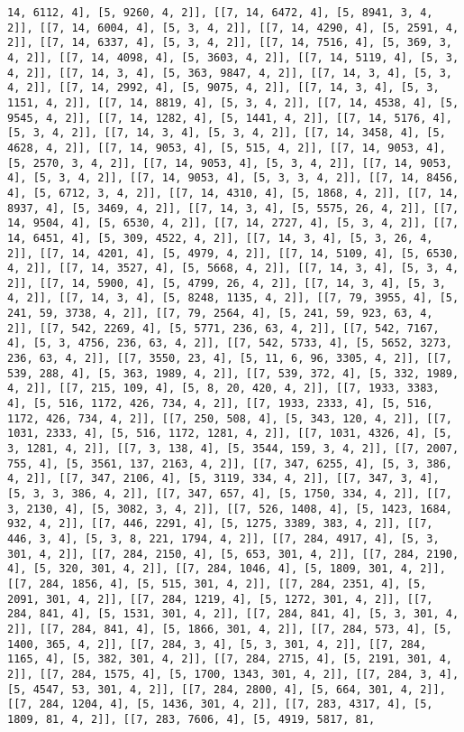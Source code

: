 \documentclass[12pt,fleqn]{article}\usepackage{../../common}
\begin{document}
\begin{verbatim}
14, 6112, 4], [5, 9260, 4, 2]], [[7, 14, 6472, 4], [5, 8941, 3, 4, 2]], [[7, 14, 6004, 4], [5, 3, 4, 2]], [[7, 14, 4290, 4], [5, 2591, 4, 2]], [[7, 14, 6337, 4], [5, 3, 4, 2]], [[7, 14, 7516, 4], [5, 369, 3, 4, 2]], [[7, 14, 4098, 4], [5, 3603, 4, 2]], [[7, 14, 5119, 4], [5, 3, 4, 2]], [[7, 14, 3, 4], [5, 363, 9847, 4, 2]], [[7, 14, 3, 4], [5, 3, 4, 2]], [[7, 14, 2992, 4], [5, 9075, 4, 2]], [[7, 14, 3, 4], [5, 3, 1151, 4, 2]], [[7, 14, 8819, 4], [5, 3, 4, 2]], [[7, 14, 4538, 4], [5, 9545, 4, 2]], [[7, 14, 1282, 4], [5, 1441, 4, 2]], [[7, 14, 5176, 4], [5, 3, 4, 2]], [[7, 14, 3, 4], [5, 3, 4, 2]], [[7, 14, 3458, 4], [5, 4628, 4, 2]], [[7, 14, 9053, 4], [5, 515, 4, 2]], [[7, 14, 9053, 4], [5, 2570, 3, 4, 2]], [[7, 14, 9053, 4], [5, 3, 4, 2]], [[7, 14, 9053, 4], [5, 3, 4, 2]], [[7, 14, 9053, 4], [5, 3, 3, 4, 2]], [[7, 14, 8456, 4], [5, 6712, 3, 4, 2]], [[7, 14, 4310, 4], [5, 1868, 4, 2]], [[7, 14, 8937, 4], [5, 3469, 4, 2]], [[7, 14, 3, 4], [5, 5575, 26, 4, 2]], [[7, 14, 9504, 4], [5, 6530, 4, 2]], [[7, 14, 2727, 4], [5, 3, 4, 2]], [[7, 14, 6451, 4], [5, 309, 4522, 4, 2]], [[7, 14, 3, 4], [5, 3, 26, 4, 2]], [[7, 14, 4201, 4], [5, 4979, 4, 2]], [[7, 14, 5109, 4], [5, 6530, 4, 2]], [[7, 14, 3527, 4], [5, 5668, 4, 2]], [[7, 14, 3, 4], [5, 3, 4, 2]], [[7, 14, 5900, 4], [5, 4799, 26, 4, 2]], [[7, 14, 3, 4], [5, 3, 4, 2]], [[7, 14, 3, 4], [5, 8248, 1135, 4, 2]], [[7, 79, 3955, 4], [5, 241, 59, 3738, 4, 2]], [[7, 79, 2564, 4], [5, 241, 59, 923, 63, 4, 2]], [[7, 542, 2269, 4], [5, 5771, 236, 63, 4, 2]], [[7, 542, 7167, 4], [5, 3, 4756, 236, 63, 4, 2]], [[7, 542, 5733, 4], [5, 5652, 3273, 236, 63, 4, 2]], [[7, 3550, 23, 4], [5, 11, 6, 96, 3305, 4, 2]], [[7, 539, 288, 4], [5, 363, 1989, 4, 2]], [[7, 539, 372, 4], [5, 332, 1989, 4, 2]], [[7, 215, 109, 4], [5, 8, 20, 420, 4, 2]], [[7, 1933, 3383, 4], [5, 516, 1172, 426, 734, 4, 2]], [[7, 1933, 2333, 4], [5, 516, 1172, 426, 734, 4, 2]], [[7, 250, 508, 4], [5, 343, 120, 4, 2]], [[7, 1031, 2333, 4], [5, 516, 1172, 1281, 4, 2]], [[7, 1031, 4326, 4], [5, 3, 1281, 4, 2]], [[7, 3, 138, 4], [5, 3544, 159, 3, 4, 2]], [[7, 2007, 755, 4], [5, 3561, 137, 2163, 4, 2]], [[7, 347, 6255, 4], [5, 3, 386, 4, 2]], [[7, 347, 2106, 4], [5, 3119, 334, 4, 2]], [[7, 347, 3, 4], [5, 3, 3, 386, 4, 2]], [[7, 347, 657, 4], [5, 1750, 334, 4, 2]], [[7, 3, 2130, 4], [5, 3082, 3, 4, 2]], [[7, 526, 1408, 4], [5, 1423, 1684, 932, 4, 2]], [[7, 446, 2291, 4], [5, 1275, 3389, 383, 4, 2]], [[7, 446, 3, 4], [5, 3, 8, 221, 1794, 4, 2]], [[7, 284, 4917, 4], [5, 3, 301, 4, 2]], [[7, 284, 2150, 4], [5, 653, 301, 4, 2]], [[7, 284, 2190, 4], [5, 320, 301, 4, 2]], [[7, 284, 1046, 4], [5, 1809, 301, 4, 2]], [[7, 284, 1856, 4], [5, 515, 301, 4, 2]], [[7, 284, 2351, 4], [5, 2091, 301, 4, 2]], [[7, 284, 1219, 4], [5, 1272, 301, 4, 2]], [[7, 284, 841, 4], [5, 1531, 301, 4, 2]], [[7, 284, 841, 4], [5, 3, 301, 4, 2]], [[7, 284, 841, 4], [5, 1866, 301, 4, 2]], [[7, 284, 573, 4], [5, 1400, 365, 4, 2]], [[7, 284, 3, 4], [5, 3, 301, 4, 2]], [[7, 284, 1165, 4], [5, 382, 301, 4, 2]], [[7, 284, 2715, 4], [5, 2191, 301, 4, 2]], [[7, 284, 1575, 4], [5, 1700, 1343, 301, 4, 2]], [[7, 284, 3, 4], [5, 4547, 53, 301, 4, 2]], [[7, 284, 2800, 4], [5, 664, 301, 4, 2]], [[7, 284, 1204, 4], [5, 1436, 301, 4, 2]], [[7, 283, 4317, 4], [5, 1809, 81, 4, 2]], [[7, 283, 7606, 4], [5, 4919, 5817, 81, 
\end{verbatim}
\end{document}
